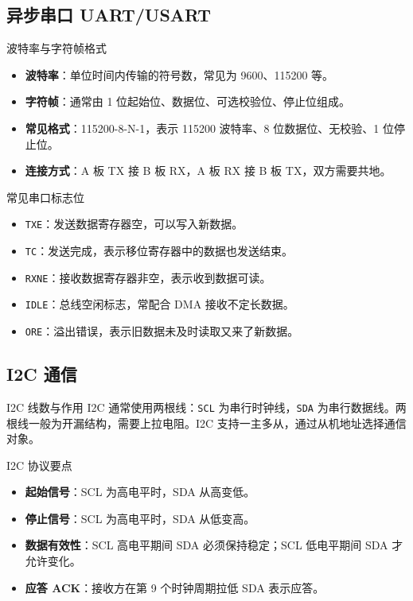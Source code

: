 \documentclass[UTF8,fontset=none,12pt]{ctexart}
\newcommand{\api}[1]{{\footnotesize\nolinkurl{#1}}}
\begin{document}
\subsection{异步串口 UART/USART}
\begin{pointbox}{波特率与字符帧格式}
\begin{itemize}
  \item \textbf{波特率}：单位时间内传输的符号数，常见为 9600、115200 等。
  \item \textbf{字符帧}：通常由 1 位起始位、数据位、可选校验位、停止位组成。
  \item \textbf{常见格式}：115200-8-N-1，表示 115200 波特率、8 位数据位、无校验、1 位停止位。
  \item \textbf{连接方式}：A 板 TX 接 B 板 RX，A 板 RX 接 B 板 TX，双方需要共地。
\end{itemize}
\end{pointbox}

\begin{pointbox}{常见串口标志位}
\begin{itemize}
  \item \api{TXE}：发送数据寄存器空，可以写入新数据。
  \item \api{TC}：发送完成，表示移位寄存器中的数据也发送结束。
  \item \api{RXNE}：接收数据寄存器非空，表示收到数据可读。
  \item \api{IDLE}：总线空闲标志，常配合 DMA 接收不定长数据。
  \item \api{ORE}：溢出错误，表示旧数据未及时读取又来了新数据。
\end{itemize}
\end{pointbox}

\subsection{I2C 通信}
\begin{pointbox}{I2C 线数与作用}
I2C 通常使用两根线：\api{SCL} 为串行时钟线，\api{SDA} 为串行数据线。两根线一般为开漏结构，需要上拉电阻。I2C 支持一主多从，通过从机地址选择通信对象。
\end{pointbox}

\begin{pointbox}{I2C 协议要点}
\begin{itemize}
  \item \textbf{起始信号}：SCL 为高电平时，SDA 从高变低。
  \item \textbf{停止信号}：SCL 为高电平时，SDA 从低变高。
  \item \textbf{数据有效性}：SCL 高电平期间 SDA 必须保持稳定；SCL 低电平期间 SDA 才允许变化。
  \item \textbf{应答 ACK}：接收方在第 9 个时钟周期拉低 SDA 表示应答。
\end{itemize}
\end{pointbox}
\end{document}
